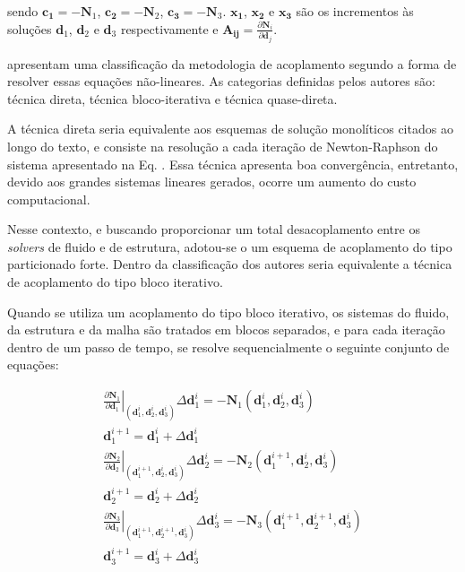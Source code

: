 \documentclass[tese_patricia]{subfiles}
\begin{document}
\noindent sendo $\mathbf{c_{1}} = - \mathbf{N}_{1}$, $\mathbf{c_{2}} = - \mathbf{N}_{2}$, $\mathbf{c_{3}} = - \mathbf{N}_{3}$. $\mathbf{x_{1}}$, $\mathbf{x_{2}}$ e $\mathbf{x_{3}}$ são os incrementos às soluções $\mathbf{d}_{1}$, $\mathbf{d}_{2}$ e $\mathbf{d}_{3}$ respectivamente e $\mathbf{A_{ij}} = \frac{\partial\mathbf{N}_{i}}{\partial\mathbf{d}_{j}}$. 

  apresentam uma classificação da metodologia de acoplamento segundo a forma de resolver essas equações não-lineares. As categorias definidas pelos autores são: técnica direta, técnica bloco-iterativa e técnica quase-direta. 

A técnica direta seria equivalente aos esquemas de solução monolíticos citados ao longo do texto, e consiste na resolução a cada iteração de Newton-Raphson do sistema apresentado na Eq. . Essa técnica apresenta boa convergência, entretanto, devido aos grandes sistemas lineares gerados, ocorre um aumento do custo computacional.

Nesse contexto, e buscando proporcionar um total desacoplamento entre os \textit{solvers} de fluido e de estrutura, adotou-se o um esquema de acoplamento do tipo particionado forte. Dentro da classificação dos autores  seria equivalente a técnica de acoplamento do tipo bloco iterativo.

Quando se utiliza um acoplamento do tipo bloco iterativo, os sistemas do fluido, da estrutura e da malha são tratados em blocos separados, e para cada iteração dentro de um passo de tempo, se resolve sequencialmente o seguinte conjunto de equações:


\begin{align}
	\left .\frac{\partial\mathbf{N}_{1}}{\partial\mathbf{d}_{1}}\right|_{\left(\mathbf{d}_{1}^{i},\mathbf{d}_{2}^{i},\mathbf{d}_{3}^{i}\right)} \Delta\mathbf{d}_{1}^{i} = - \mathbf{N}_{1}\left(\mathbf{d}_{1}^{i},\mathbf{d}_{2}^{i},\mathbf{d}_{3}^{i}\right)  \label{eq:Fluido} \\
	\mathbf{d}_{1}^{i+1} =  \mathbf{d}_{1}^{i} + \Delta\mathbf{d}_{1}^{i} \label{eq:upFluido}	\\
	\left.\frac{\partial\mathbf{N}_{2}}{\partial\mathbf{d}_{2}}\right|_{\left(\mathbf{d}_{1}^{i+1},\mathbf{d}_{2}^{i},\mathbf{d}_{3}^{i}\right)} \Delta\mathbf{d}_{2}^{i} = - \mathbf{N}_{2}\left(\mathbf{d}_{1}^{i+1},\mathbf{d}_{2}^{i},\mathbf{d}_{3}^{i}\right) \label{eq:Estrutura}\\
	\mathbf{d}_{2}^{i+1} =  \mathbf{d}_{2}^{i} + \Delta\mathbf{d}_{2}^{i} \label{eq:upEstrutura}\\
	\left.\frac{\partial\mathbf{N}_{3}}{\partial\mathbf{d}_{3}}\right|_{\left(\mathbf{d}_{1}^{i+1},\mathbf{d}_{2}^{i+1},\mathbf{d}_{3}^{i}\right)} \Delta\mathbf{d}_{3}^{i} = - \mathbf{N}_{3}\left(\mathbf{d}_{1}^{i+1},\mathbf{d}_{2}^{i+1},\mathbf{d}_{3}^{i}\right) \label{eq:Malha}\\
	\mathbf{d}_{3}^{i+1} =  \mathbf{d}_{3}^{i} + \Delta\mathbf{d}_{3}^{i}  \label{eq:upMalha}
\end{align}
\end{document}
